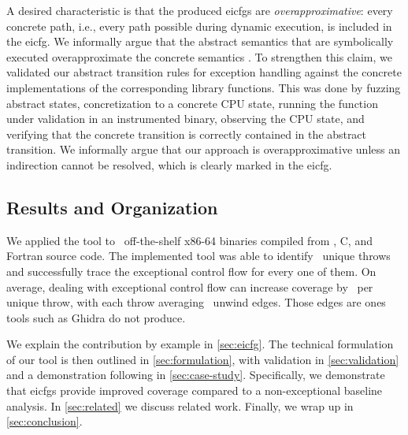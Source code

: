 A desired characteristic is that the produced \acp{eicfg} are \emph{overapproximative}: every concrete path, i.e., every path possible during dynamic execution, is included in the \ac{eicfg}.
We informally argue that the abstract semantics that are symbolically executed overapproximate the concrete semantics \autocite{cousot1996abstract}.
To strengthen this claim, we validated our abstract transition rules for exception handling against the concrete implementations of the corresponding library functions.
This was done by fuzzing abstract states, concretization to a concrete CPU state, running the function under validation in an instrumented binary, observing the CPU state, and verifying that the concrete transition is correctly contained in the abstract transition.
We informally argue that our approach is overapproximative unless an indirection cannot be resolved, which is clearly marked in the \ac{eicfg}.


\subsection{Results and Organization}
We applied the tool to \totalbins\ off-the-shelf x86-64 binaries compiled from \Cpp, C, and Fortran source code.
The implemented tool was able to identify \uniquethrows\ unique throws and successfully trace the exceptional control flow for every one of them.
On average, dealing with exceptional control flow can increase coverage by \avgdiffinst\ per unique throw, with each throw averaging \avgunwinds\ unwind edges.
Those edges are ones tools such as Ghidra do not produce.

We explain the contribution by example in \cref{sec:eicfg}.
The technical formulation of our tool is then outlined in \cref{sec:formulation},
with validation in \cref{sec:validation} and a demonstration following in \cref{sec:case-study}.
Specifically, we demonstrate that \acp{eicfg} provide improved coverage compared to a non-exceptional baseline analysis.
In \cref{sec:related} we discuss related work.
Finally, we wrap up in \cref{sec:conclusion}.

